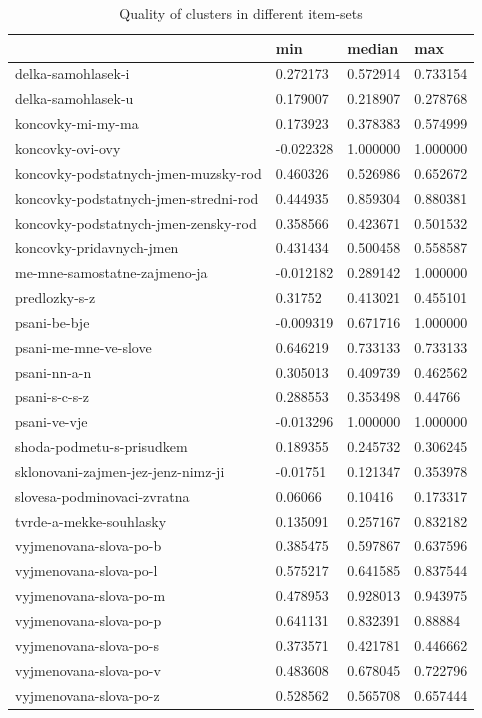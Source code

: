 \documentclass[
  digital, %
  table,   %
  nolof,     %
  nolot,     %
  nocover,
  color
]{fithesis3}
\begin{document}
\begin{table}
  \begin{tabular}{ | l | l | l | l | }
    \hline
       & min & median & max \\ \hline
      delka-samohlasek-i & 0.272173 & 0.572914 & 0.733154 \\ \hline
      delka-samohlasek-u & 0.179007 & 0.218907 & 0.278768 \\ \hline
      koncovky-mi-my-ma & 0.173923 & 0.378383 & 0.574999 \\ \hline
      koncovky-ovi-ovy & -0.022328 & 1.000000 & 1.000000 \\ \hline
      koncovky-podstatnych-jmen-muzsky-rod & 0.460326 & 0.526986 & 0.652672 \\ \hline
      koncovky-podstatnych-jmen-stredni-rod & 0.444935 & 0.859304 & 0.880381 \\ \hline
      koncovky-podstatnych-jmen-zensky-rod & 0.358566 & 0.423671 & 0.501532 \\ \hline
      koncovky-pridavnych-jmen & 0.431434 & 0.500458 & 0.558587 \\ \hline
      me-mne-samostatne-zajmeno-ja & -0.012182 & 0.289142 & 1.000000 \\ \hline
      predlozky-s-z & 0.31752 & 0.413021 & 0.455101 \\ \hline
      psani-be-bje & -0.009319 & 0.671716 & 1.000000 \\ \hline
      psani-me-mne-ve-slove & 0.646219 & 0.733133 & 0.733133 \\ \hline
      psani-nn-a-n & 0.305013 & 0.409739 & 0.462562 \\ \hline
      psani-s-c-s-z & 0.288553 & 0.353498 & 0.44766 \\ \hline
      psani-ve-vje & -0.013296 & 1.000000 & 1.000000 \\ \hline
      shoda-podmetu-s-prisudkem & 0.189355 & 0.245732 & 0.306245 \\ \hline
      sklonovani-zajmen-jez-jenz-nimz-ji & -0.01751 & 0.121347 & 0.353978 \\ \hline
      slovesa-podminovaci-zvratna & 0.06066 & 0.10416 & 0.173317 \\ \hline
      tvrde-a-mekke-souhlasky & 0.135091 & 0.257167 & 0.832182 \\ \hline
      vyjmenovana-slova-po-b & 0.385475 & 0.597867 & 0.637596 \\ \hline
      vyjmenovana-slova-po-l & 0.575217 & 0.641585 & 0.837544 \\ \hline
      vyjmenovana-slova-po-m & 0.478953 & 0.928013 & 0.943975 \\ \hline
      vyjmenovana-slova-po-p & 0.641131 & 0.832391 & 0.88884 \\ \hline
      vyjmenovana-slova-po-s & 0.373571 & 0.421781 & 0.446662 \\ \hline
      vyjmenovana-slova-po-v & 0.483608 & 0.678045 & 0.722796 \\ \hline
      vyjmenovana-slova-po-z & 0.528562 & 0.565708 & 0.657444 \\ \hline
  \end{tabular}
  \caption{Quality of clusters in different item-sets}
  \label{tab:quality-of-clusters}
\end{table}
\end{document}

